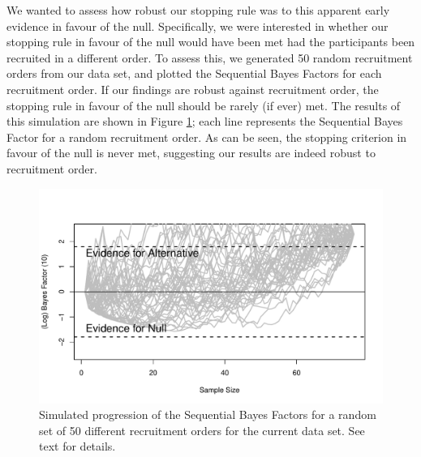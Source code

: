 \documentclass[a4paper, doc, natbib]{apa6}
\begin{document}
We wanted to assess how robust our stopping rule was to this apparent early evidence in favour of the null. Specifically, we were interested in whether our stopping rule in favour of the null would have been met had the participants been recruited in a different order. To assess this, we generated 50 random recruitment orders from our data set, and plotted the Sequential Bayes Factors for each recruitment order. If our findings are robust against recruitment order, the stopping rule in favour of the null should be rarely (if ever) met.  The results of this simulation are shown in Figure \ref{fig:recruitmentOrder}; each line represents the Sequential Bayes Factor for a random recruitment order. As can be seen, the stopping criterion in favour of the null is never met, suggesting our results are indeed robust to recruitment order.


\begin{figure}
\begin{center}
\includegraphics[width = \textwidth]{Images/recruitmentOrder.pdf}
\caption{Simulated progression of the Sequential Bayes Factors for a random set of 50 different recruitment orders for the current data set. See text for details.}
\label{fig:recruitmentOrder}
\end{center}
\end{figure}











\end{document}
